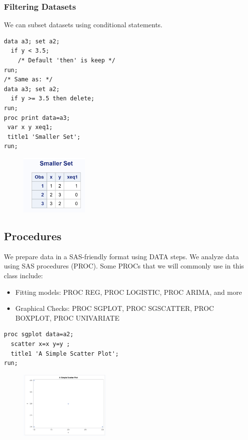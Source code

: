 \documentclass[12pt]{notes}
\begin{document}
\subsubsection*{Filtering Datasets}
We can subset datasets using conditional statements.

\begin{verbatim}
data a3; set a2;
  if y < 3.5;
    /* Default 'then' is keep */
run;
/* Same as: */
data a3; set a2;
  if y >= 3.5 then delete;
run;
proc print data=a3;
 var x y xeq1;
 title1 'Smaller Set';
run;
\end{verbatim}

\begin{figure}[H]
\centering
\includegraphics[width = 0.3\textwidth]{figures/module1/sas3.png}
\end{figure}

\subsection*{Procedures}
We prepare data in a SAS-friendly format using DATA steps. We analyze data using SAS procedures (PROC). Some PROCs that we will commonly use in this class include:
\begin{itemize}
\item Fitting models: PROC REG, PROC LOGISTIC, PROC ARIMA, and more
\item Graphical Checks: PROC SGPLOT, PROC SGSCATTER, PROC BOXPLOT, PROC UNIVARIATE
\end{itemize} 

\begin{verbatim}
proc sgplot data=a2;
  scatter x=x y=y ;
  title1 'A Simple Scatter Plot';
run;
\end{verbatim}


\begin{figure}[H]
\centering
\includegraphics[width = 0.4\textwidth]{figures/module1/sas4.png}
\end{figure}
\end{document}
